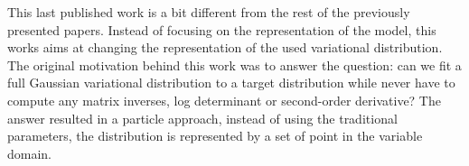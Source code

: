 


\graphicspath{{7/figures/}}
This last published work is a bit different from the rest of the previously presented papers.
Instead of focusing on the representation of the model, this works aims at changing the representation of the used variational distribution.
The original motivation behind this work was to answer the question: can we fit a full Gaussian variational distribution to a target distribution while never have to compute any matrix inverses, log determinant or second-order derivative?
The answer resulted in a particle approach, instead of using the traditional parameters, the distribution is represented by a set of point in the variable domain.


